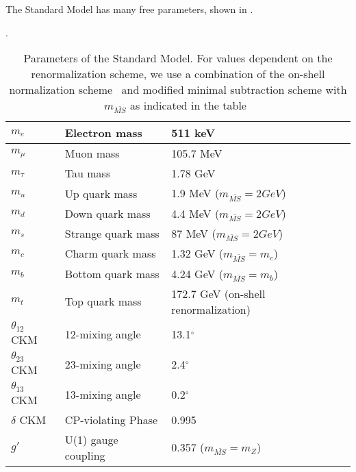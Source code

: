 The Standard Model has many free parameters, shown in .
\begin{table}
\centering
\caption{Parameters of the Standard Model.  For values dependent on the renormalization scheme, we use a combination of the on-shell normalization scheme~\cite{Hollik:1988ii, Bardin:1989vz, Kennedy:1988rt, Sirlin:1980nh} and  modified minimal subtraction scheme with $m_{\bar{MS}}$ as indicated in the table~\cite{ Fanchiotti:1992tu}}.
\label{tab:sm_free_parameters}
\begin{tabular}{| l | l | l |}
\hline
$m_e$             & Electron mass                  & 511 keV                           \\ \hline
$m_\mu$           & Muon mass                      & 105.7 MeV                         \\ \hline
$m_\tau$          & Tau mass                       & 1.78 GeV                          \\ \hline
$m_u$             & Up quark mass                  & 1.9 MeV   ($m_{\bar{MS}} = 2 GeV$)                        \\ \hline
$m_d$             & Down quark mass                & 4.4 MeV   ($m_{\bar{MS}} = 2 GeV$)                       \\ \hline
$m_s$             & Strange quark mass             & 87 MeV    ($m_{\bar{MS}} = 2 GeV$)                        \\ \hline
$m_c$             & Charm quark mass               & 1.32 GeV  ($m_{\bar{MS}} = m_c$)                        \\ \hline
$m_b$             & Bottom quark mass              & 4.24 GeV  ($m_{\bar{MS}} = m_b$)  \\ \hline
$m_t$             & Top quark mass                 & 172.7 GeV (on-shell renormalization)                       \\ \hline
$\theta_{12}$ CKM & 12-mixing angle                & 13.1$^{\circ}$                    \\ \hline
$\theta_{23}$ CKM & 23-mixing angle                & 2.4$^{\circ}$                     \\ \hline
$\theta_{13}$ CKM & 13-mixing angle                & 0.2$^{\circ}$                     \\ \hline
$\delta$ CKM      & CP-violating Phase             & 0.995                             \\ \hline
$g'$              & U(1) gauge coupling            & 0.357     ($m_{\bar{MS}} = m_Z$)                         \\ \hline

\end{tabular}
\end{table}

